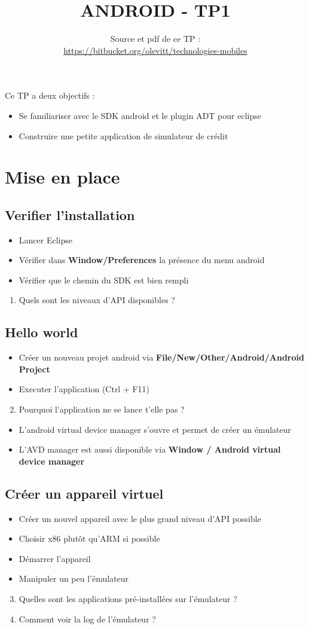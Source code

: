 \documentclass{article}
\title{ANDROID - TP1}
\date{Source et pdf de ce TP
:\\ \href{https://bitbucket.org/olevitt/technologies-mobiles}{https://bitbucket.org/olevitt/technologies-mobiles}}
\begin{document}
Ce TP a deux objectifs :
\begin{itemize}
\item Se familiariser avec le SDK android et le plugin ADT pour eclipse
\item Construire une petite application de simulateur de crédit
\end{itemize}
\section{Mise en place}
\subsection{Verifier l'installation}
\begin{itemize}
\item Lancer Eclipse
\item Vérifier dans \textbf{Window/Preferences} la présence du menu android
\item Vérifier que le chemin du SDK est bien rempli
\end{itemize}
\begin{enumerate}
\item Quels sont les niveaux d'API disponibles ?
\end{enumerate}
\subsection{Hello world}
\begin{itemize}
\item Créer un nouveau projet android via \textbf{File/New/Other/Android/Android
Project}
\item Executer l'application (Ctrl + F11)
\end{itemize}
\begin{enumerate}
 \setcounter{enumi}{1}
\item Pourquoi l'application ne se lance t'elle pas ?
\end{enumerate}
\begin{itemize}
\item L'android virtual device manager s'ouvre et permet de créer un
émulateur
\item L'AVD manager est aussi disponible via \textbf{Window / Android virtual
device manager}
\end{itemize}
\subsection{Créer un appareil virtuel}
\begin{itemize}
\item Créer un nouvel appareil avec le plus grand niveau d'API possible
\item Choisir x86 plutôt qu'ARM si possible
\item Démarrer l'appareil
\item Manipuler un peu l'émulateur
\end{itemize}
\begin{enumerate}
 \setcounter{enumi}{2}
\item Quelles sont les applications pré-installées sur l'émulateur ?
\item Comment voir la log de l'émulateur ?
\end{enumerate}
\newpage
\end{document}
